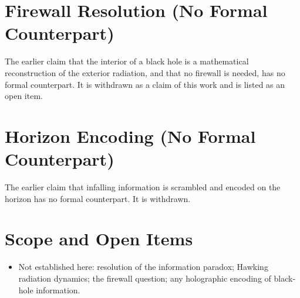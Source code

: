 \documentclass[11pt, a4paper]{article}
\begin{document}
\section{Firewall Resolution (No Formal Counterpart)}
The earlier claim that the interior of a black hole is a mathematical reconstruction of the exterior radiation, and that no firewall is needed, has no formal counterpart. It is withdrawn as a claim of this work and is listed as an open item.

\section{Horizon Encoding (No Formal Counterpart)}
The earlier claim that infalling information is scrambled and encoded on the horizon has no formal counterpart. It is withdrawn.

\section{Scope and Open Items}
\begin{itemize}
  \item Not established here: resolution of the information paradox; Hawking radiation dynamics; the firewall question; any holographic encoding of black-hole information.
\end{itemize}
\end{document}
